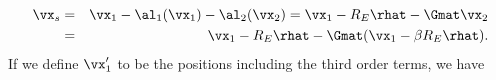 \begin{eqnarray}
\vx_s &=& \vx_1 - \al_1(\vx_1) - \al_2(\vx_2) = \vx_1 - R_E \rhat-  \Gmat \vx_2 \nonumber\\
&=& \vx_1 - R_E \rhat -  \Gmat (\vx_1 - \beta R_E \rhat).
\label{eq:backgroundorder2}
\end{eqnarray}
If we define $\vx_1'$ to be the positions including the third order terms, we have